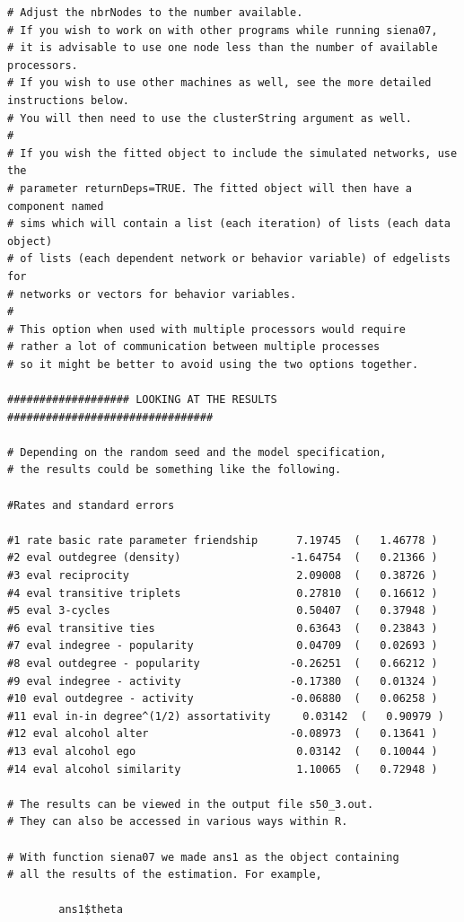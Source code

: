 \documentclass[a4paper,fleqn]{article}
\newcommand{\+}{\, + \,}
\begin{document}
{\begin{verbatim}
# Adjust the nbrNodes to the number available.
# If you wish to work on with other programs while running siena07,
# it is advisable to use one node less than the number of available processors.
# If you wish to use other machines as well, see the more detailed instructions below.
# You will then need to use the clusterString argument as well.
#
# If you wish the fitted object to include the simulated networks, use the
# parameter returnDeps=TRUE. The fitted object will then have a component named
# sims which will contain a list (each iteration) of lists (each data object)
# of lists (each dependent network or behavior variable) of edgelists for
# networks or vectors for behavior variables.
#
# This option when used with multiple processors would require
# rather a lot of communication between multiple processes
# so it might be better to avoid using the two options together.

################### LOOKING AT THE RESULTS ################################

# Depending on the random seed and the model specification,
# the results could be something like the following.

#Rates and standard errors

#1 rate basic rate parameter friendship      7.19745  (   1.46778 )
#2 eval outdegree (density)                 -1.64754  (   0.21366 )
#3 eval reciprocity                          2.09008  (   0.38726 )
#4 eval transitive triplets                  0.27810  (   0.16612 )
#5 eval 3-cycles                             0.50407  (   0.37948 )
#6 eval transitive ties                      0.63643  (   0.23843 )
#7 eval indegree - popularity                0.04709  (   0.02693 )
#8 eval outdegree - popularity              -0.26251  (   0.66212 )
#9 eval indegree - activity                 -0.17380  (   0.01324 )
#10 eval outdegree - activity               -0.06880  (   0.06258 )
#11 eval in-in degree^(1/2) assortativity     0.03142  (   0.90979 )
#12 eval alcohol alter                      -0.08973  (   0.13641 )
#13 eval alcohol ego                         0.03142  (   0.10044 )
#14 eval alcohol similarity                  1.10065  (   0.72948 )

# The results can be viewed in the output file s50_3.out.
# They can also be accessed in various ways within R.

# With function siena07 we made ans1 as the object containing
# all the results of the estimation. For example,

        ans1$theta


\end{verbatim}}
\end{document}

